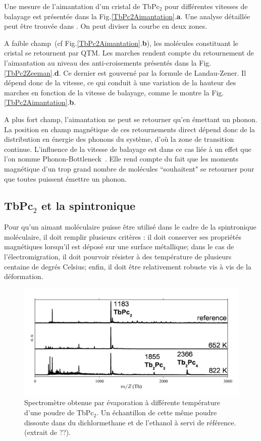Une mesure de l'aimantation d'un cristal de TbPc$_2$ pour différentes vitesses de balayage est présentée dans la Fig.\ref{TbPc2Aimantation}.\textbf{a}. Une analyse détaillée peut \^etre trouvée dans \cite{Ishikawa2005}. On peut diviser la courbe en deux zones. 

A faible champ~(cf Fig.\ref{TbPc2Aimantation}.\textbf{b}), les molécules constituant le cristal se retournent par QTM. Les marches rendent compte du retournement de l'aimantation au niveau des anti-croisements présentés dans la Fig.\ref{TbPc2Zeeman}.\textbf{d}. Ce dernier est gouverné par la formule de Landau-Zener. Il dépend donc de la vitesse, ce qui conduit à une variation de la hauteur des marches en fonction de la vitesse de balayage, comme le montre la Fig.\ref{TbPc2Aimantation}.\textbf{b}. 

A plus fort champ, l'aimantation ne peut se retourner qu'en émettant un phonon. La position en champ magnétique de ces retournements direct dépend donc de la distribution en énergie des phonons du système, d'où la zone de transition continue. L'influence de la vitesse de balayage est dans ce cas liée à un effet que l'on nomme Phonon-Bottleneck~\cite{VanVleck1941}. Elle rend compte du fait que les moments magnétique d'un trop grand nombre de molécules ``souhaitent" se retourner pour que toutes puissent émettre un phonon.

\subsection{TbPc$_2$ et la spintronique}
Pour qu'un aimant moléculaire puisse être utilisé dans le cadre de la spintronique moléculaire, il doit remplir plusieurs critères : il doit conserver ses propriétés magnétiques lorsqu'il est déposé sur une surface métallique; dans le cas de l'électromigration, il doit pourvoir résister à des température de plusieurs centaine de degrés Celsius; enfin, il doit être relativement robuste vis à vis de la déformation.

\begin{figure}
\centering \includegraphics[scale=0.45]{Resultats/TbPcResTemp/TbPcResTemp.pdf} 
\caption{Spectromètre obtenue par évaporation à différente température d'une poudre de TbPc$_2$. Un échantillon de cette même poudre dissoute dans du dichlormethane et de l'ethanol à servi de référence. (extrait de ??).}
\label{SpectMass}
\end{figure}

